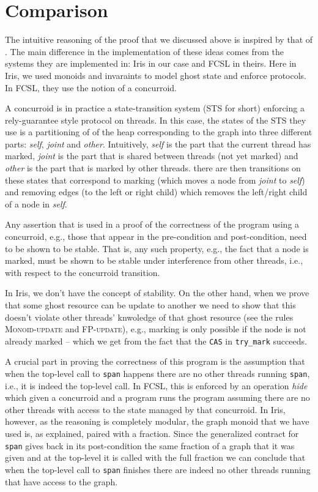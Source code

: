 \documentclass[]{scrartcl}
\def\MyMLe{\lstinline[language=MyML, basicstyle=\small\ttfamily, mathescape=true]}
\begin{document}
\section{Comparison}
The intuitive reasoning of the proof that we discussed above is inspired by that of \cite{Sergey:2015:MVF:2737924.2737964}.
The main difference in the implementation of these ideas comes from the
systems they are implemented in: Iris in our case and FCSL in theirs.
Here in Iris, we used monoids and invaraints to model ghost state and
enforce protocols.
In FCSL, they use the notion of a concurroid.

A concurroid is in practice a state-transition system (STS for short)
enforcing a rely-guarantee style protocol on threads.
In this case, the states of the STS they use is a partitioning of of the
heap corresponding to the graph into three different parts:
\textit{self}, \textit{joint} and \textit{other}.
Intuitively, \textit{self} is the part that the current thread has marked,
\textit{joint} is the part that is shared between threads (not yet marked)
and \textit{other} is the part that is marked by other threads.
there are then transitions on these states that correspond to marking
(which moves a node from \textit{joint} to \textit{self}) and removing
edges (to the left or right child) which removes the left/right child of a
node in \textit{self}.

Any assertion that is used in a proof of the correctness of the program
using a concurroid, e.g., those that appear in the pre-condition and post-condition,
need to be shown to be stable.
That is, any such property, e.g., the fact that a node is marked, must be
shown to be stable under interference from other threads, i.e., with
respect to the concurroid transition.

In Iris, we don't have the concept of stability.
On the other hand, when we prove that some ghost resource can be
update to another we need to show that this doesn't violate other
threads' knwoledge of that ghost resource
(see the rules \textsc{Monoid-update} and \textsc{FP-update}), e.g., marking is only possible
if the node is not already marked -- which we get from the fact that the \MyMLe|CAS| in \MyMLe|try_mark| succeeds.

A crucial part in proving the correctness of this program is the
assumption that when the top-level call to \MyMLe{span} happens there are
no other threads running \MyMLe|span|, i.e., it is indeed the top-level call.
In FCSL, this is enforced by an operation \textit{hide} which given a
concurroid and a program runs the program assuming there are no
other threads with access to the state managed by that concurroid.
In Iris, however, as the reasoning is completely modular, the graph
monoid that we have used is, as explained, paired with a fraction.
Since the generalized contract for \MyMLe|span| gives back in its
post-condition the same fraction of a graph that it was given and at
the top-level it is called with the full fraction we can conclude that
when the top-level call to \MyMLe|span| finishes there are indeed no
other threads running that have access to the graph.
\end{document}
